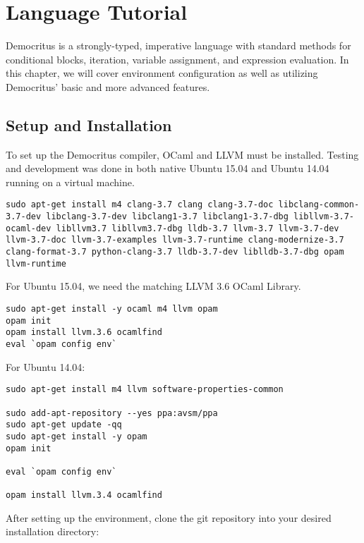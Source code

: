 \chapter{Language Tutorial}

Democritus is a strongly-typed, imperative language with standard methods for conditional blocks, iteration, variable assignment, and expression evaluation. In this chapter, we will cover environment configuration as well as utilizing Democritus' basic and more advanced features.

\section{Setup and Installation}

	To set up the Democritus compiler, OCaml and LLVM must be installed. Testing and development was done in both native Ubuntu 15.04 and Ubuntu 14.04 running on a virtual machine.

	\begin{lstlisting}
sudo apt-get install m4 clang-3.7 clang clang-3.7-doc libclang-common-3.7-dev libclang-3.7-dev libclang1-3.7 libclang1-3.7-dbg libllvm-3.7-ocaml-dev libllvm3.7 libllvm3.7-dbg lldb-3.7 llvm-3.7 llvm-3.7-dev llvm-3.7-doc llvm-3.7-examples llvm-3.7-runtime clang-modernize-3.7 clang-format-3.7 python-clang-3.7 lldb-3.7-dev liblldb-3.7-dbg opam llvm-runtime
	\end{lstlisting}

	\medskip \noindent For Ubuntu 15.04, we need the matching LLVM 3.6 OCaml Library.

	\begin{lstlisting}
sudo apt-get install -y ocaml m4 llvm opam
opam init
opam install llvm.3.6 ocamlfind
eval `opam config env`
\end{lstlisting}

	\medskip \noindent For Ubuntu 14.04:

	\begin{lstlisting}
sudo apt-get install m4 llvm software-properties-common

sudo add-apt-repository --yes ppa:avsm/ppa
sudo apt-get update -qq
sudo apt-get install -y opam
opam init

eval `opam config env`

opam install llvm.3.4 ocamlfind
	\end{lstlisting}

	\medskip \noindent After setting up the environment, clone the git repository into your desired installation directory:

